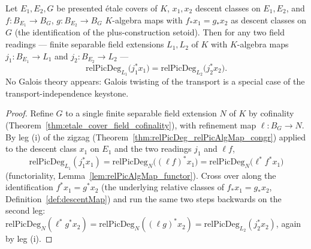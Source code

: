 \begin{theorem}
  \label{thm:relPicDeg_eq_of_descentMap_eq}
  \leanok
  Let \(E_1, E_2, G\) be presented \'etale covers of \(K\), \(x_1, x_2\) descent classes on
  \(E_1, E_2\), and \(f \colon B_{E_1} \to B_G\), \(g \colon B_{E_2} \to B_G\) \(K\)-algebra
  maps with \(f_{*} x_1 = g_{*} x_2\) as descent classes on \(G\) (the identification of the
  plus-construction setoid). Then for any two field readings — finite separable field
  extensions \(L_1, L_2\) of \(K\) with \(K\)-algebra maps \(j_1 \colon B_{E_1} \to L_1\) and
  \(j_2 \colon B_{E_2} \to L_2\) —
  \[
    \mathrm{relPicDeg}_{L_1}\bigl(j_1^{*} x_1\bigr)
      = \mathrm{relPicDeg}_{L_2}\bigl(j_2^{*} x_2\bigr).
  \]
  No Galois theory appears: Galois twisting of the transport is a special case of the
  transport-independence keystone.
\end{theorem}
\begin{proof}
  \leanok
  Refine \(G\) to a single finite separable field extension \(N\) of \(K\) by cofinality
  (Theorem~\ref{thm:etale_cover_field_cofinality}), with refinement map
  \(\ell \colon B_G \to N\). By leg (i) of the zigzag
  (Theorem~\ref{thm:relPicDeg_relPicAlgMap_congr}) applied to the descent class \(x_1\) on
  \(E_1\) and the two readings \(j_1\) and \(\ell f\),
  \[
    \mathrm{relPicDeg}_{L_1}(j_1^{*} x_1) = \mathrm{relPicDeg}_{N}\bigl((\ell f)^{*} x_1\bigr)
      = \mathrm{relPicDeg}_{N}\bigl(\ell^{*} f^{*} x_1\bigr)
  \]
  (functoriality, Lemma~\ref{lem:relPicAlgMap_functor}). Cross over along the identification
  \(f^{*} x_1 = g^{*} x_2\) (the underlying relative classes of \(f_{*}x_1 = g_{*}x_2\),
  Definition~\ref{def:descentMap}) and run the same two steps backwards on the second leg:
  \(\mathrm{relPicDeg}_{N}(\ell^{*} g^{*} x_2) = \mathrm{relPicDeg}_{N}((\ell g)^{*} x_2) =
  \mathrm{relPicDeg}_{L_2}(j_2^{*} x_2)\), again by leg (i).
\end{proof}

